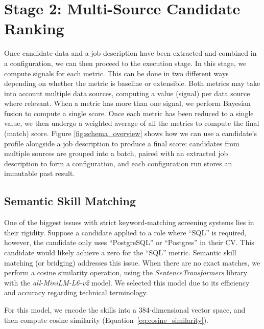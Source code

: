 \section{Stage 2: Multi-Source Candidate Ranking}
Once candidate data and a job description have been extracted and combined in a configuration, we can then proceed to
the execution stage. In this stage, we compute signals for each metric. This can be done in two different ways
depending on whether the metric is baseline or extensible. Both metrics may take into account multiple data sources,
computing a value (signal) per data source where relevant. When a metric has more than one signal, we perform Bayesian 
fusion to compute a single score. Once each metric has been reduced to a single value, we then undergo a 
weighted average of all the metrics to compute the final (match) score. Figure \ref{fig:schema_overview} 
shows how we can use a candidate's profile alongside a job description to produce a final score: candidates from multiple 
sources are grouped into a batch, paired with an extracted job description to form a configuration, and each configuration 
run stores an immutable past result.





\subsection{Semantic Skill Matching}
\label{subsec:semantic-skill-matching}

One of the biggest issues with strict keyword-matching screening systems lies in their rigidity.
Suppose a candidate applied to a role where ``SQL'' is required, however, the candidate only uses
``PostgreSQL'' or ``Postgres'' in their CV. This candidate would likely achieve a zero for the ``SQL'' metric.
Semantic skill matching (or bridging) addresses this issue. When there are no exact matches,
we perform a cosine similarity operation, using the \textit{SentenceTransformers} library with the 
\textit{all-MiniLM-L6-v2} model. We selected this model due to its efficiency and accuracy regarding
technical terminology. 

For this model, we encode the skills into a 384-dimensional vector space, and then compute cosine
similarity (Equation~\ref{eq:cosine_similarity}).

